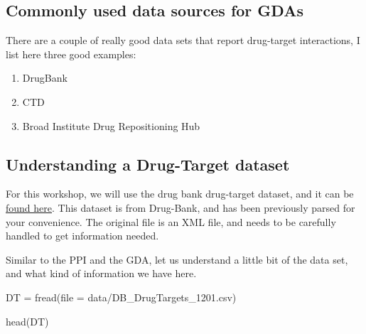\documentclass[
]{book}
\newenvironment{Shaded}{\begin{snugshade}}{\end{snugshade}}
\newcommand{\AttributeTok}[1]{\textcolor[rgb]{0.77,0.63,0.00}{#1}}
\newcommand{\FunctionTok}[1]{\textcolor[rgb]{0.00,0.00,0.00}{#1}}
\newcommand{\NormalTok}[1]{#1}
\newcommand{\OtherTok}[1]{\textcolor[rgb]{0.56,0.35,0.01}{#1}}
\newcommand{\StringTok}[1]{\textcolor[rgb]{0.31,0.60,0.02}{#1}}
\begin{document}
\hypertarget{commonly-used-data-sources-for-gdas-1}{%
\subsection{Commonly used data sources for GDAs}\label{commonly-used-data-sources-for-gdas-1}}

There are a couple of really good data sets that report drug-target interactions, I list here three good examples:

\begin{enumerate}
\def\labelenumi{\arabic{enumi}.}
\item
  DrugBank \citep{Wishart2006, wishart2017}
\item
  CTD \citep{davis2020}
\item
  Broad Institute Drug Repositioning Hub \citep{corsello2017}
\end{enumerate}

\hypertarget{understanding-a-drug-target-dataset}{%
\subsection{Understanding a Drug-Target dataset}\label{understanding-a-drug-target-dataset}}

For this workshop, we will use the drug bank drug-target dataset, and it can be \href{https://github.com/deisygysi/NetMed_Workshop/blob/master/data/DB_DrugTargets_1201.csv}{found here}. This dataset is from Drug-Bank, and has been previously parsed for your convenience. The original file is an XML file, and needs to be carefully handled to get information needed.

Similar to the PPI and the GDA, let us understand a little bit of the data set, and what kind of information we have here.

\begin{Shaded}
\begin{Highlighting}[]
\NormalTok{DT }\OtherTok{=} \FunctionTok{fread}\NormalTok{(}\AttributeTok{file =} \StringTok{\textquotesingle{}data/DB\_DrugTargets\_1201.csv\textquotesingle{}}\NormalTok{)}

\FunctionTok{head}\NormalTok{(DT)}
\end{Highlighting}
\end{Shaded}
\end{document}
